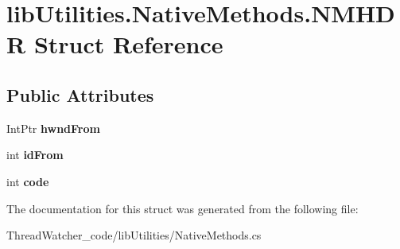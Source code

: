 \hypertarget{structlib_utilities_1_1_native_methods_1_1_n_m_h_d_r}{\section{lib\+Utilities.\+Native\+Methods.\+N\+M\+H\+D\+R Struct Reference}
\label{structlib_utilities_1_1_native_methods_1_1_n_m_h_d_r}
}
\subsection*{Public Attributes}
\begin{DoxyCompactItemize}
\item 
\hypertarget{structlib_utilities_1_1_native_methods_1_1_n_m_h_d_r_a08a810f5b7ac9d10a8499da066053941}{Int\+Ptr {\bfseries hwnd\+From}}\label{structlib_utilities_1_1_native_methods_1_1_n_m_h_d_r_a08a810f5b7ac9d10a8499da066053941}

\item 
\hypertarget{structlib_utilities_1_1_native_methods_1_1_n_m_h_d_r_a6e7576a380321f331623580bdb49b824}{int {\bfseries id\+From}}\label{structlib_utilities_1_1_native_methods_1_1_n_m_h_d_r_a6e7576a380321f331623580bdb49b824}

\item 
\hypertarget{structlib_utilities_1_1_native_methods_1_1_n_m_h_d_r_ac52481113422d920b7c710553c7044a6}{int {\bfseries code}}\label{structlib_utilities_1_1_native_methods_1_1_n_m_h_d_r_ac52481113422d920b7c710553c7044a6}

\end{DoxyCompactItemize}


The documentation for this struct was generated from the following file\+:\begin{DoxyCompactItemize}
\item 
Thread\+Watcher\+\_\+code/lib\+Utilities/Native\+Methods.\+cs\end{DoxyCompactItemize}
